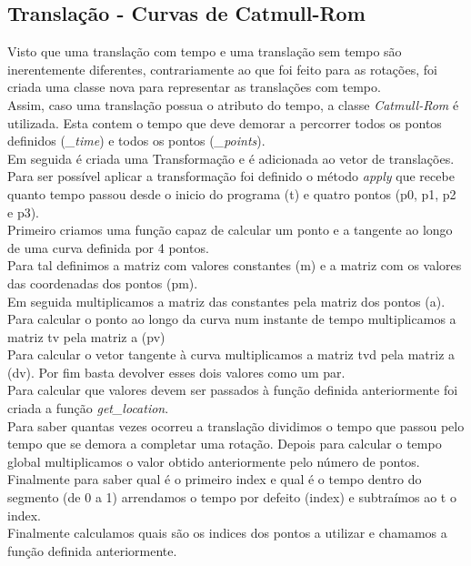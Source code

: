 \documentclass[a4paper]{report}
\begin{document}


\subsection{Translação - Curvas de Catmull-Rom}
Visto que uma translação com tempo e uma translação sem tempo são inerentemente
diferentes, contrariamente ao que foi feito para as rotações, foi criada uma
classe nova para representar as translações com tempo.\\
Assim, caso uma translação possua o atributo do tempo, a classe
\textit{Catmull-Rom} é utilizada. Esta contem o tempo que deve demorar a
percorrer todos os pontos definidos (\textit{\_time}) e todos os pontos
(\textit{\_points}).\\
Em seguida é criada uma Transformação e é adicionada ao vetor de translações.\\
Para ser possível aplicar a transformação foi definido o método \textit{apply}
que recebe quanto tempo passou desde o inicio do programa (t) e quatro pontos
(p0, p1, p2 e p3).\\
Primeiro criamos uma função capaz de calcular um ponto e a tangente ao longo de
uma curva definida por 4 pontos.\\
Para tal definimos a matriz com valores constantes (m) e a matriz com os valores
das coordenadas dos pontos (pm).\\


Em seguida multiplicamos a matriz das constantes pela matriz dos pontos (a).\\
Para calcular o ponto ao longo da curva num instante de tempo multiplicamos a
matriz tv pela matriz a (pv)\\
Para calcular o vetor tangente à curva multiplicamos a matriz tvd pela matriz a
(dv). Por fim basta devolver esses dois valores como um par.\\
Para calcular que valores devem ser passados à função definida anteriormente foi
criada a função \textit{get\_location}.\\
Para saber quantas vezes ocorreu a translação dividimos o tempo que passou pelo
tempo que se demora a completar uma rotação. Depois para calcular o tempo global
multiplicamos o valor obtido anteriormente pelo número de pontos.\\
Finalmente para saber qual é o primeiro index e qual é o tempo dentro do
segmento (de 0 a 1) arrendamos o tempo por defeito (index) e subtraímos ao t o
index.\\
Finalmente calculamos quais são os indices dos pontos a utilizar e chamamos a
função definida anteriormente.
\end{document}
